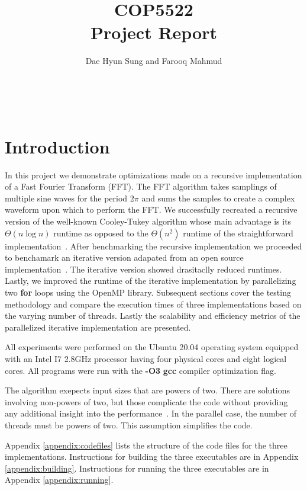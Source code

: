 \documentclass{amsart}
\begin{document}
\title{COP5522\\{\bf Project Report}}%
\author{Dae Hyun Sung and Farooq Mahmud}%
\date{}


\maketitle\

\section{Introduction}
In this project we demonstrate optimizations made on a recursive implementation of a Fast Fourier Transform (FFT). The FFT algorithm takes samplings of multiple sine waves for the period
$2\pi$ and sums the samples to create a complex waveform upon which to perform the FFT. We successfully recreated a recursive version of the well-known Cooley-Tukey algorithm whose main advantage is its $\Theta(n\log n)$ runtime as opposed to the $\Theta(n^{2})$ runtime of the straightforward implementation~\cite{cormen}. After benchmarking the recursive implementation we proceeded to benchamark an iterative version adapated from an open source implementation~\cite{rshuston}. The iterative version showed drasitaclly reduced runtimes. Lastly, we improved the runtime of the iterative implementation by parallelizing two  \textbf{for} loops using the OpenMP library. Subsequent sections cover the testing methodology and compare the execution times of three implementations based on the varying number of threads. Lastly the scalability and efficiency metrics of the parallelized iterative implementation are presented.

All experiments were performed on the Ubuntu 20.04 operating system equipped with an Intel I7 2.8GHz processor having four physical cores and eight logical cores. All programs were run with the \textbf{-O3} \textbf{gcc} compiler optimization flag.

The algorithm exepects input sizes that are powers of two. There are solutions involving non-powers of two, but those complicate the code without providing any additional insight into the performance~\cite{cormen}. In the parallel case, the number of threads must be powers of two. This assumption simplifies the code.

Appendix \ref{appendix:codefiles} lists the structure of the code files for the three implementations. Instructions for building the three executables are in Appendix \ref{appendix:building}. Instructions for running the three executables are in Appendix \ref{appendix:running}.
\end{document}
